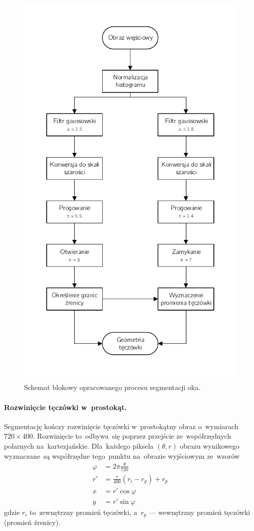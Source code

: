 \documentclass[11pt,a4paper]{article}
\begin{document}
\begin{figure}
    \centering
    \includegraphics[height=20cm]{res/img/diagram.pdf}
    \caption{Schemat blokowy opracowanego procesu segmentacji oka.}
    \label{fig:block-diagram}
\end{figure}

\paragraph{Rozwinięcie tęczówki w~prostokąt.}
Segmentację kończy rozwinięcie tęczówki w~prostokątny obraz o~wymiarach $720 \times 400$.
Rozwinięcie to~odbywa~się poprzez przejście ze~współrzędnych polarnych na~kartezjańskie.
Dla~każdego piksela $(\theta,r)$ obrazu wynikowego wyznaczane~są współrzędne tego~punktu na~obrazie wyjściowym ze~wzorów
\begin{align*}
    \varphi &= 2 \pi \frac{\theta}{720} \\
    r' &= \frac{r}{400} (r_i - r_p) + r_p \\
    x &= r' \cos \varphi \\
    y &= r' \sin \varphi
\end{align*}
gdzie $r_i$ to~zewnętrzny promień tęczówki, a~$r_p$ --- wewnętrzny promień tęczówki (promień źrenicy).
\end{document}
